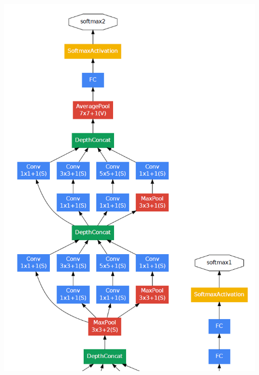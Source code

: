 \begin{frame}[allowframebreaks]
\begin{columns}
		\begin{column}{.4\textwidth}
		\begin{center}
			\includegraphics[scale=0.5]{figs/GoogleNet_scheme_3}
		\end{center}
		\end{column}%
	\end{columns}







\end{frame}

